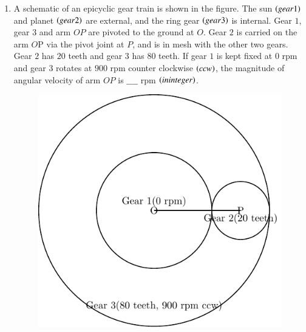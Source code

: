 \documentclass[journal]{IEEEtran}
\begin{document}
 \begin{enumerate}
     \item A schematic of an epicyclic gear train is shown in the figure. The sun $\left(gear 1\right)$ and planet $\left(gear 2\right)$ are external, and the ring gear $\left(gear 3\right)$ is internal. Gear $1$, gear $3$ and arm $OP$ are pivoted to the ground at $O$. Gear $2$ is carried on the arm $O$P via the pivot joint at $P$, and is in mesh with the other two gears. Gear $2$ has $20$ teeth and gear $3$ has $80$ teeth. If gear $1$ is kept fixed at $0$ rpm and gear $3$ rotates at $900$ rpm counter clockwise $\left(ccw\right)$, the magnitude of angular velocity of arm $OP$ is   $\_\_\_\_$ rpm $\left(in integer\right)$.
     
\begin{figure}[h!]
         \centering
        \includegraphics[width=0.7\linewidth]{figure/fig1/fig1.pdf}
		\caption{}
        \label{stemplot}

\end{figure}


\end{enumerate}
\end{document}

